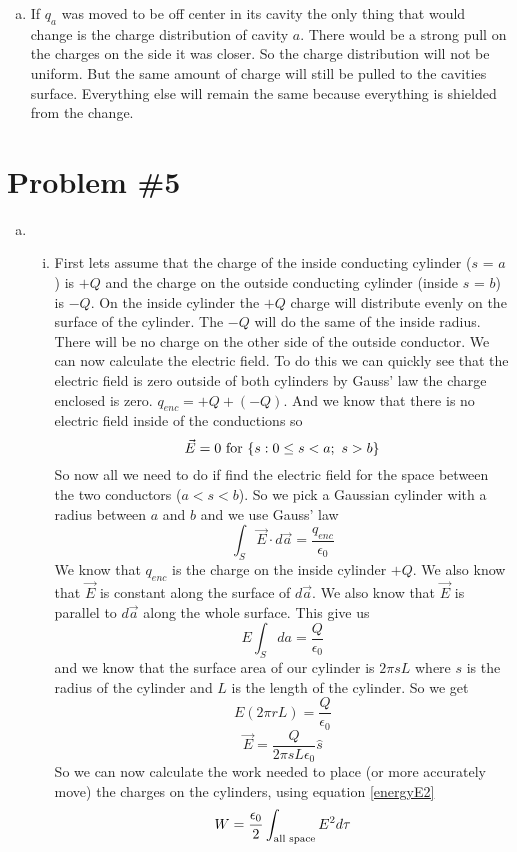 \documentclass[11pt]{article}
\numberwithin{equation}{section}
\newcommand{\vecE}{\vec{E}}
\begin{document}
\begin{enumerate}[(a)]
\item
If $q_a$ was moved to be off center in its cavity the only thing that would change is the charge distribution of cavity $a$. There would be a strong pull on the charges on the side it was closer. So the charge distribution will not be uniform. But the same amount of charge will still be pulled to the cavities surface. Everything else will remain the same because everything is shielded from the change.
\end{enumerate}

\section{Problem \#5}
\begin{enumerate}[(a)]
\item
\begin{enumerate}[(i)]
\item
First lets assume that the charge of the inside conducting cylinder ($s$ = $a$) is $+Q$ and the charge on the outside conducting cylinder (inside $s$ = $b$) is $-Q$. On the inside cylinder the $+Q$ charge will distribute evenly on the surface of the cylinder. The $-Q$ will do the same of the inside radius. There will be no charge on the other side of the outside conductor.
We can now calculate the electric field. To do this we can quickly see that the electric field is zero outside of both cylinders by Gauss' law the charge enclosed is zero. $q_{enc} = +Q + (-Q)$. And we know that there is no electric field inside of the conductions so 
$$\vecE = 0\ \textnormal{for}\ \{s: 0\le s<a;\ s>b\}$$
So now all we need to do if find the electric field for the space between the two conductors ($a<s<b$). So we pick a Gaussian cylinder with a radius between $a$ and $b$ and we use Gauss' law
$$\int_S\vecE\cdot d\vec{a} = \frac{q_{enc}}{\epsilon_0}$$
We know that $q_{enc}$ is the charge on the inside cylinder $+Q$. We also know that $\vecE$ is constant along the surface of $d\vec{a}$. We also know that $\vecE$ is parallel to $d\vec{a}$ along the whole surface. This give us
$$E\int_S da = \frac{Q}{\epsilon_0}$$
and we know that the surface area of our cylinder is $2\pi s L$ where $s$ is the radius of the cylinder and $L$ is the length of the cylinder. So we get
$$E(2\pi rL)= \frac{Q}{\epsilon_0}$$
$$\vecE=\frac{Q}{2\pi sL\epsilon_0}\hat{s}$$
So we can now calculate the work needed to place (or more accurately move) the charges on the cylinders, using equation \ref{energyE2}
$$W = \frac{\epsilon_0}{2} \int_{\textnormal{all space}} E^2 d\tau$$

\end{enumerate}
\end{enumerate}
\end{document}
